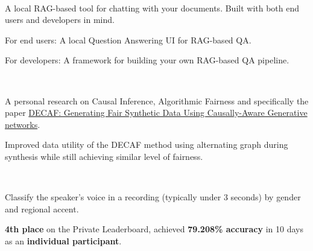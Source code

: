 \\
\begin{zitemize}
    \item A local RAG-based tool for chatting with your documents. Built with both end users and developers in mind.
    \item For end users: A local Question Answering UI for RAG-based QA.
    \item For developers: A framework for building your own RAG-based QA pipeline.
\end{zitemize}


\\
\begin{zitemize}
    \item A personal research on Causal Inference, Algorithmic Fairness and specifically the paper \href{https://arxiv.org/abs/2110.12884}{DECAF: Generating Fair Synthetic Data Using Causally-Aware Generative networks}.
    \item Improved data utility of the DECAF method using alternating graph during synthesis while still achieving similar level of  fairness.
\end{zitemize}

\\
\begin{zitemize}
    \item Classify the speaker's voice in a recording (typically under 3 seconds) by gender and regional accent.
    \item \textbf{4th place} on the Private Leaderboard, achieved \textbf{79.208\%
        accuracy} in 10 days as an \textbf{individual participant}.
\end{zitemize}

